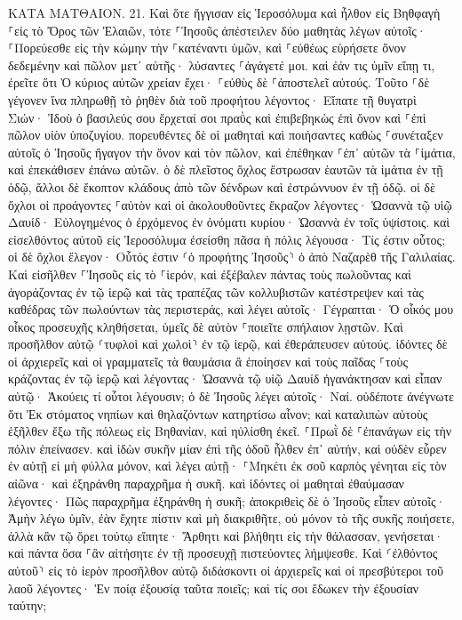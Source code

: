 \documentclass[twoside, 9pt]{extreport}
\begin{document}
ΚΑΤΑ ΜΑΤΘΑΙΟΝ.
21.
Καὶ ὅτε ἤγγισαν εἰς Ἱεροσόλυμα καὶ ἦλθον εἰς Βηθφαγὴ ⸀εἰς τὸ Ὄρος τῶν Ἐλαιῶν, τότε ⸀Ἰησοῦς ἀπέστειλεν δύο μαθητὰς 
λέγων αὐτοῖς· ⸀Πορεύεσθε εἰς τὴν κώμην τὴν ⸀κατέναντι ὑμῶν, καὶ ⸀εὐθέως εὑρήσετε ὄνον δεδεμένην καὶ πῶλον μετ᾽ αὐτῆς· λύσαντες ⸀ἀγάγετέ μοι. 
καὶ ἐάν τις ὑμῖν εἴπῃ τι, ἐρεῖτε ὅτι Ὁ κύριος αὐτῶν χρείαν ἔχει· ⸀εὐθὺς δὲ ⸀ἀποστελεῖ αὐτούς. 
Τοῦτο ⸀δὲ γέγονεν ἵνα πληρωθῇ τὸ ῥηθὲν διὰ τοῦ προφήτου λέγοντος· 
Εἴπατε τῇ θυγατρὶ Σιών· Ἰδοὺ ὁ βασιλεύς σου ἔρχεταί σοι πραῢς καὶ ἐπιβεβηκὼς ἐπὶ ὄνον καὶ ⸀ἐπὶ πῶλον υἱὸν ὑποζυγίου. 
πορευθέντες δὲ οἱ μαθηταὶ καὶ ποιήσαντες καθὼς ⸀συνέταξεν αὐτοῖς ὁ Ἰησοῦς 
ἤγαγον τὴν ὄνον καὶ τὸν πῶλον, καὶ ἐπέθηκαν ⸀ἐπ᾽ αὐτῶν τὰ ⸀ἱμάτια, καὶ ἐπεκάθισεν ἐπάνω αὐτῶν. 
ὁ δὲ πλεῖστος ὄχλος ἔστρωσαν ἑαυτῶν τὰ ἱμάτια ἐν τῇ ὁδῷ, ἄλλοι δὲ ἔκοπτον κλάδους ἀπὸ τῶν δένδρων καὶ ἐστρώννυον ἐν τῇ ὁδῷ. 
οἱ δὲ ὄχλοι οἱ προάγοντες ⸀αὐτὸν καὶ οἱ ἀκολουθοῦντες ἔκραζον λέγοντες· Ὡσαννὰ τῷ υἱῷ Δαυίδ· Εὐλογημένος ὁ ἐρχόμενος ἐν ὀνόματι κυρίου· Ὡσαννὰ ἐν τοῖς ὑψίστοις. 
καὶ εἰσελθόντος αὐτοῦ εἰς Ἱεροσόλυμα ἐσείσθη πᾶσα ἡ πόλις λέγουσα· Τίς ἐστιν οὗτος; 
οἱ δὲ ὄχλοι ἔλεγον· Οὗτός ἐστιν ⸂ὁ προφήτης Ἰησοῦς⸃ ὁ ἀπὸ Ναζαρὲθ τῆς Γαλιλαίας. 
Καὶ εἰσῆλθεν ⸀Ἰησοῦς εἰς τὸ ⸀ἱερόν, καὶ ἐξέβαλεν πάντας τοὺς πωλοῦντας καὶ ἀγοράζοντας ἐν τῷ ἱερῷ καὶ τὰς τραπέζας τῶν κολλυβιστῶν κατέστρεψεν καὶ τὰς καθέδρας τῶν πωλούντων τὰς περιστεράς, 
καὶ λέγει αὐτοῖς· Γέγραπται· Ὁ οἶκός μου οἶκος προσευχῆς κληθήσεται, ὑμεῖς δὲ αὐτὸν ⸀ποιεῖτε σπήλαιον λῃστῶν. 
Καὶ προσῆλθον αὐτῷ ⸂τυφλοὶ καὶ χωλοὶ⸃ ἐν τῷ ἱερῷ, καὶ ἐθεράπευσεν αὐτούς. 
ἰδόντες δὲ οἱ ἀρχιερεῖς καὶ οἱ γραμματεῖς τὰ θαυμάσια ἃ ἐποίησεν καὶ τοὺς παῖδας ⸀τοὺς κράζοντας ἐν τῷ ἱερῷ καὶ λέγοντας· Ὡσαννὰ τῷ υἱῷ Δαυίδ ἠγανάκτησαν 
καὶ εἶπαν αὐτῷ· Ἀκούεις τί οὗτοι λέγουσιν; ὁ δὲ Ἰησοῦς λέγει αὐτοῖς· Ναί. οὐδέποτε ἀνέγνωτε ὅτι Ἐκ στόματος νηπίων καὶ θηλαζόντων κατηρτίσω αἶνον; 
καὶ καταλιπὼν αὐτοὺς ἐξῆλθεν ἔξω τῆς πόλεως εἰς Βηθανίαν, καὶ ηὐλίσθη ἐκεῖ. 
⸀Πρωῒ δὲ ⸀ἐπανάγων εἰς τὴν πόλιν ἐπείνασεν. 
καὶ ἰδὼν συκῆν μίαν ἐπὶ τῆς ὁδοῦ ἦλθεν ἐπ᾽ αὐτήν, καὶ οὐδὲν εὗρεν ἐν αὐτῇ εἰ μὴ φύλλα μόνον, καὶ λέγει αὐτῇ· ⸀Μηκέτι ἐκ σοῦ καρπὸς γένηται εἰς τὸν αἰῶνα· καὶ ἐξηράνθη παραχρῆμα ἡ συκῆ. 
καὶ ἰδόντες οἱ μαθηταὶ ἐθαύμασαν λέγοντες· Πῶς παραχρῆμα ἐξηράνθη ἡ συκῆ; 
ἀποκριθεὶς δὲ ὁ Ἰησοῦς εἶπεν αὐτοῖς· Ἀμὴν λέγω ὑμῖν, ἐὰν ἔχητε πίστιν καὶ μὴ διακριθῆτε, οὐ μόνον τὸ τῆς συκῆς ποιήσετε, ἀλλὰ κἂν τῷ ὄρει τούτῳ εἴπητε· Ἄρθητι καὶ βλήθητι εἰς τὴν θάλασσαν, γενήσεται· 
καὶ πάντα ὅσα ⸀ἂν αἰτήσητε ἐν τῇ προσευχῇ πιστεύοντες λήμψεσθε. 
Καὶ ⸂ἐλθόντος αὐτοῦ⸃ εἰς τὸ ἱερὸν προσῆλθον αὐτῷ διδάσκοντι οἱ ἀρχιερεῖς καὶ οἱ πρεσβύτεροι τοῦ λαοῦ λέγοντες· Ἐν ποίᾳ ἐξουσίᾳ ταῦτα ποιεῖς; καὶ τίς σοι ἔδωκεν τὴν ἐξουσίαν ταύτην; 
\end{document}
